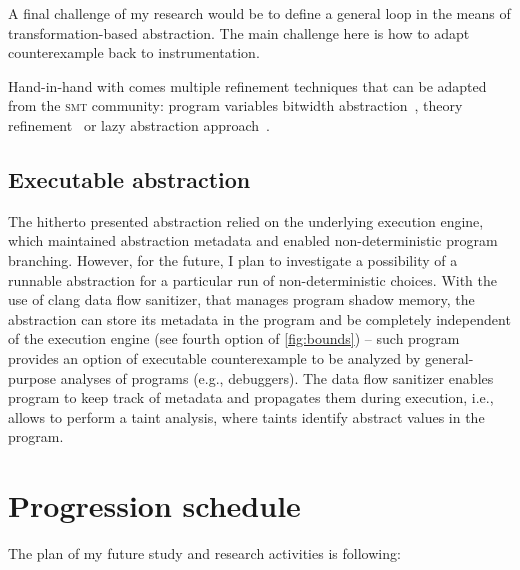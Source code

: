 A final challenge of my research would be to define a general \cegar loop in the
means of transformation-based abstraction. The main challenge here is how to
adapt counterexample back to instrumentation.

Hand-in-hand with \cegar comes multiple refinement techniques that can be
adapted from the \textsc{smt} community: program variables bitwidth
abstraction~\cite{Jonavs2018}, theory refinement~\cite{Hyvarinen2017} or lazy
abstraction approach~\cite{Henzinger2002}.

\subsection{ Executable abstraction }

The hitherto presented abstraction relied on the underlying execution engine,
which maintained abstraction metadata and enabled non-deter\-mi\-ni\-stic program
branching. However, for the future, I plan to investigate a possibility of a
runnable abstraction for a particular run of non-deterministic choices.  With
the use of clang data flow sanitizer, that manages program shadow memory, the
abstraction can store its metadata in the program and be completely independent
of the execution engine (see fourth option of \autoref{fig:bounds}) -- such
program provides an option of executable counterexample to be analyzed by
general-purpose analyses of \llvm programs (e.g., debuggers).  The data flow
sanitizer enables program to keep track of metadata and propagates them during
execution, i.e., allows to perform a taint analysis, where taints identify abstract
values in the program.

\newpage
\section{Progression schedule}

The plan of my future study and research activities is following:

